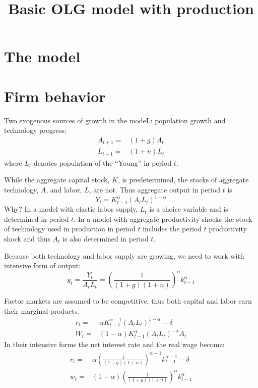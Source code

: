 \documentclass[11pt]{article}
\begin{document}
\title{Basic OLG model with production}

\section{The model}

\section{Firm behavior}
Two exogenous sources of growth in the modeL: population growth and technology progress:
\begin{align}
A_{t+1} =& (1 + g)A_t \\
L_{t+1} =& (1 + n)L_t 
\end{align}
where $L_t$ denotes population of the ``Young'' in period $t$.

While the aggregate capital stock, $K$, is predetermined, the stocks of aggregate technology, $A$, and labor, $L$, are not. Thus aggregate output in period $t$ is
\begin{equation}
Y_t = K_{t-1}^{\alpha}(A_tL_t)^{1-\alpha} 
\end{equation}
Why? In a model with elastic labor supply, $L_t$ is a choice variable and is determined in period $t$. In a model with aggregate productivity shocks the stock of technology used in production in period $t$ includes the period $t$ productivity shock and thus $A_t$ is also determined in period $t$. 

Because both technology and labor supply are growing, we need to work with intensive form of output:
\begin{equation}\label{eq:production}
y_t = \frac{Y_t}{A_tL_t} = \left(\frac{1}{(1 + g)(1 + n)}\right)^{\alpha}k^{\alpha}_{t-1}
\end{equation}

Factor markets are assumed to be competitive, thus both capital and labor earn their marginal products.
\begin{align}
r_t =& \alpha K_{t-1}^{\alpha - 1}(A_tL_t)^{1 - \alpha} - \delta \\
W_t =& (1 - \alpha) K_{t-1}^{\alpha}(A_tL_t)^{-\alpha}A_t
\end{align}
In their intensive forms the net interest rate and the real wage become:
\begin{align}
r_t =& \alpha \left(\frac{1}{(1 + g)(1 + n)}\right)^{\alpha-1}k^{\alpha-1}_{t-1} - \delta \\
w_t =& (1 - \alpha)\left(\frac{1}{(1 + g)(1 + n)}\right)^{\alpha}k^{\alpha}_{t-1}
\end{align}
\end{document}
